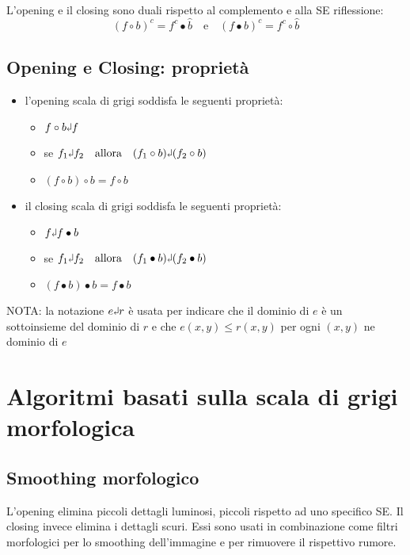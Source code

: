 L'opening e il closing sono duali rispetto al complemento e alla SE riflessione:
$$
(f \circ b)^c = f^c \bullet \hat{b} \quad \text{e} \quad (f \bullet b)^c = f^c \circ \hat{b}
$$

\subsection{Opening e Closing: proprietà}
\begin{itemize}
	\item l'opening scala di grigi soddisfa le seguenti proprietà:
	\begin{itemize}
		\item $f \circ b \rotatebox[origin=c]{180}{$\Rsh$} f$
		
		\item se $f_1 \rotatebox[origin=c]{180}{$\Rsh$}	f_2 \quad \text{allora} \quad (f_1 \circ b) \rotatebox[origin=c]{180}{$\Rsh$}(f_2 \circ b)$
		
		\item $(f \circ b) \circ b = f \circ b$ 
	\end{itemize}
	
	\item il closing scala di grigi soddisfa le seguenti proprietà:
	\begin{itemize}
		\item $f \rotatebox[origin=c]{180}{$\Rsh$} f \bullet b$
		
		\item se $f_1 \rotatebox[origin=c]{180}{$\Rsh$}	f_2 \quad \text{allora} \quad (f_1 \bullet b) \rotatebox[origin=c]{180}{$\Rsh$}	 (f_2 \bullet b)$
		
		\item $(f \bullet b) \bullet b = f \bullet b$
	\end{itemize}
\end{itemize}
NOTA: la notazione $e \rotatebox[origin=c]{180}{$\Rsh$}	 r$ è usata per indicare che il dominio di $e$ è un sottoinsieme del dominio di $r$ e che $e(x, y) \leq r(x,y)$ per ogni $(x, y)$ ne dominio di $e$

\section{Algoritmi basati sulla scala di grigi morfologica}

\subsection{Smoothing morfologico}
L'opening elimina piccoli dettagli luminosi, piccoli rispetto ad uno specifico SE. Il closing invece elimina i dettagli scuri. Essi sono usati in combinazione come filtri morfologici per lo smoothing dell'immagine e per rimuovere il rispettivo rumore.

